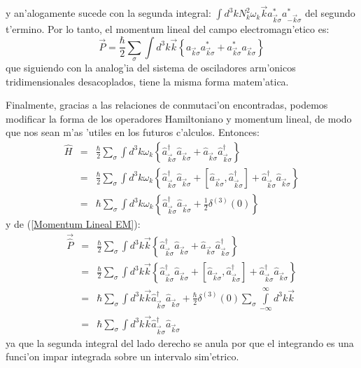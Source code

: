 y an'alogamente sucede con la segunda integral: $\int d^{3}kN_{k}^{2}%
\omega_{k}\vec{k}a_{\vec{k}\sigma}^{\ast}a_{-\vec{k}\sigma}^{\ast}$ del
segundo t'ermino. Por lo tanto, el momentum lineal del campo
electromagn'etico es:%
\begin{equation}
\vec{P}=\frac{\hbar}{2}\sum_{\sigma}\int d^{3}k\vec{k}\left\{ a_{\vec
{k}\sigma}a_{\vec{k}\sigma}^{\ast}+a_{\vec{k}\sigma}^{\ast}a_{\vec{k}\sigma
}\right\} \label{Momentum Lineal EM}%
\end{equation}
que siguiendo con la analog'ia del sistema de osciladores arm'onicos
tridimensionales desacoplados, tiene la misma forma matem'atica.

Finalmente, gracias a las relaciones de conmutaci'on encontradas, podemos
modificar la forma de los operadores Hamiltoniano y momentum lineal, de modo
que nos sean m'as 'utiles en los futuros c'alculos. Entonces:%
\begin{eqnarray}
\hat{H} & = &\frac{\hbar}{2}\sum_{\sigma}\int d^{3}k\omega_{k}\left\{ \hat
{a}_{\vec{k}\sigma}^{\dagger}\hat{a}_{\vec{k}\sigma}+\hat{a}_{\vec{k}\sigma
}\hat{a}_{\vec{k}\sigma}^{\dagger}\right\} \nonumber\\
& = &\frac{\hbar}{2}\sum_{\sigma}\int d^{3}k\omega_{k}\left\{ \hat{a}_{\vec
{k}\sigma}^{\dagger}\hat{a}_{\vec{k}\sigma}+\left[ \hat{a}_{\vec{k}\sigma
},\hat{a}_{\vec{k}\sigma}^{\dagger}\right] +\hat{a}_{\vec{k}\sigma}^{\dagger
}\hat{a}_{\vec{k}\sigma}\right\} \nonumber\\
& = &\hbar\sum_{\sigma}\int d^{3}k\omega_{k}\left\{ \hat{a}_{\vec{k}\sigma
}^{\dagger}\hat{a}_{\vec{k}\sigma}+\frac{1}{2}\delta^{\left( 3\right)
}(0) \right\} \label{Operador Hamiltoniano EM}%
\end{eqnarray}
y de (\ref{Momentum Lineal EM}):%
\begin{eqnarray}
\overrightarrow{\hat{P}} & = &\frac{\hbar}{2}\sum_{\sigma}\int d^{3}k\vec
{k}\left\{ \hat{a}_{\vec{k}\sigma}^{\dagger}\hat{a}_{\vec{k}\sigma}+\hat
{a}_{\vec{k}\sigma}\hat{a}_{\vec{k}\sigma}^{\dagger}\right\} \nonumber\\
& = &\frac{\hbar}{2}\sum_{\sigma}\int d^{3}k\vec{k}\left\{ \hat{a}_{\vec
{k}\sigma}^{\dagger}\hat{a}_{\vec{k}\sigma}+\left[ \hat{a}_{\vec{k}\sigma
},\hat{a}_{\vec{k}\sigma}^{\dagger}\right] +\hat{a}_{\vec{k}\sigma}^{\dagger
}\hat{a}_{\vec{k}\sigma}\right\} \nonumber\\
& = &\hbar\sum_{\sigma}\int d^{3}k\vec{k}\hat{a}_{\vec{k}\sigma}^{\dagger}%
\hat{a}_{\vec{k}\sigma}+\frac{\hbar}{2}\delta^{\left( 3\right) }\left(
0\right) \sum_{\sigma}\int\limits_{-\infty}^{\infty}d^{3}k\vec{k}\nonumber\\
& = &\hbar\sum_{\sigma}\int d^{3}k\vec{k}\hat{a}_{\vec{k}\sigma}^{\dagger}%
\hat{a}_{\vec{k}\sigma}\label{Operador Momentum Lineal EM}%
\end{eqnarray}
ya que la segunda integral del lado derecho se anula por que el integrando es
una funci'on impar integrada sobre un intervalo sim'etrico.


